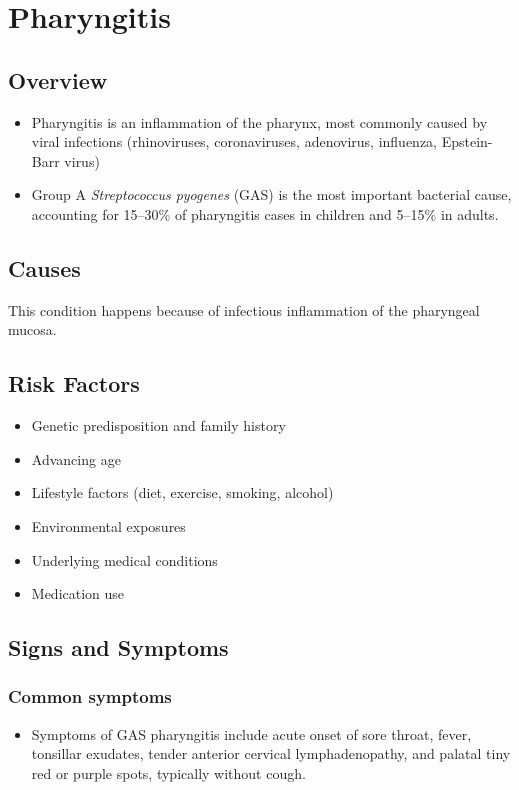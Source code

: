 \chapter{Pharyngitis}
\label{sec:Pharyngitis}

\section{Overview}


\begin{itemize}[noitemsep]
  \item Pharyngitis is an inflammation of the pharynx, most commonly caused by viral infections (rhinoviruses, coronaviruses, adenovirus, influenza, Epstein-Barr virus)
  \item Group A \textit{Streptococcus pyogenes} (GAS) is the most important bacterial cause, accounting for 15--30\% of pharyngitis cases in children and 5--15\% in adults.
\end{itemize}
\section{Causes}
This condition happens because of infectious inflammation of the pharyngeal mucosa.     
\section{Risk Factors}

\begin{itemize}[noitemsep]
  \item Genetic predisposition and family history
  \item Advancing age
  \item Lifestyle factors (diet, exercise, smoking, alcohol)
  \item Environmental exposures
  \item Underlying medical conditions
  \item Medication use
\end{itemize}
\section{Signs and Symptoms}

\subsection{Common symptoms}
\begin{itemize}[noitemsep]
  \item Symptoms of GAS pharyngitis include acute onset of sore throat, fever, tonsillar exudates, tender anterior cervical lymphadenopathy, and palatal tiny red or purple spots, typically without cough. 
  \end{itemize}

